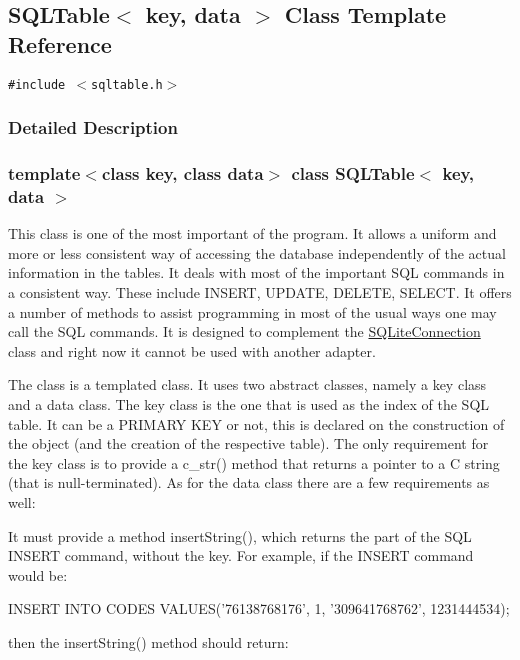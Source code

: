 \hypertarget{classSQLTable}{
\subsection{SQLTable$<$ key, data $>$ Class Template Reference}
\label{classSQLTable}
}
{\tt \#include $<$sqltable.h$>$}



\subsubsection{Detailed Description}
\subsubsection*{template$<$class key, class data$>$ class SQLTable$<$ key, data $>$}

This class is one of the most important of the program. It allows a uniform and more or less consistent way of accessing the database independently of the actual information in the tables. It deals with most of the important SQL commands in a consistent way. These include INSERT, UPDATE, DELETE, SELECT. It offers a number of methods to assist programming in most of the usual ways one may call the SQL commands. It is designed to complement the \hyperlink{classSQLiteConnection}{SQLite\-Connection} class and right now it cannot be used with another adapter.

The class is a templated class. It uses two abstract classes, namely a key class and a data class. The key class is the one that is used as the index of the SQL table. It can be a PRIMARY KEY or not, this is declared on the construction of the object (and the creation of the respective table). The only requirement for the key class is to provide a c\_\-str() method that returns a pointer to a C string (that is null-terminated). As for the data class there are a few requirements as well:\begin{CompactItemize}
\item 
It must provide a method insert\-String(), which returns the part of the SQL INSERT command, without the key. For example, if the INSERT command would be:\par
\end{CompactItemize}
INSERT INTO CODES VALUES('76138768176', 1, '309641768762', 1231444534);\par


then the insert\-String() method should return:\par


